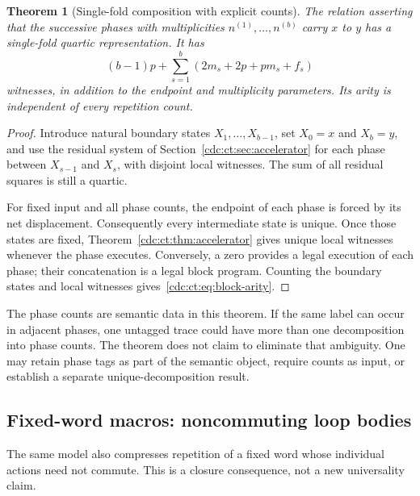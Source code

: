 \documentclass[11pt,a4paper]{article}
\newtheorem{theorem}{Theorem}[section]
\theoremstyle{definition}
\theoremstyle{remark}
\begin{document}
\begin{theorem}[Single-fold composition with explicit counts]\label{cdc:ct:thm:block-composition}
The relation asserting that the successive phases with multiplicities
$n^{(1)},\ldots,n^{(b)}$ carry $x$ to $y$ has a single-fold quartic representation. It has
\begin{equation}\label{cdc:ct:eq:block-arity}
 (b-1)p+\sum_{s=1}^b(2m_s+2p+pm_s+f_s)
\end{equation}
witnesses, in addition to the endpoint and multiplicity parameters. Its arity is independent of every repetition count.
\end{theorem}
\begin{proof}
Introduce natural boundary states $X_1,\ldots,X_{b-1}$, set $X_0=x$ and $X_b=y$, and use the residual system of Section~\ref{cdc:ct:sec:accelerator} for each phase between $X_{s-1}$ and $X_s$, with disjoint local witnesses. The sum of all residual squares is still a quartic.

For fixed input and all phase counts, the endpoint of each phase is forced by its net displacement. Consequently every intermediate state is unique. Once those states are fixed, Theorem~\ref{cdc:ct:thm:accelerator} gives unique local witnesses whenever the phase executes. Conversely, a zero provides a legal execution of each phase; their concatenation is a legal block program. Counting the boundary states and local witnesses gives~\eqref{cdc:ct:eq:block-arity}.
\end{proof}
The phase counts are semantic data in this theorem. If the same label can occur in adjacent phases, one untagged trace could have more than one decomposition into phase counts. The theorem does not claim to eliminate that ambiguity. One may retain phase tags as part of the semantic object, require counts as input, or establish a separate unique-decomposition result.

\subsection{Fixed-word macros: noncommuting loop bodies}
The same model also compresses repetition of a fixed word whose individual actions need not commute. This is a closure consequence, not a new universality claim.
\end{document}
